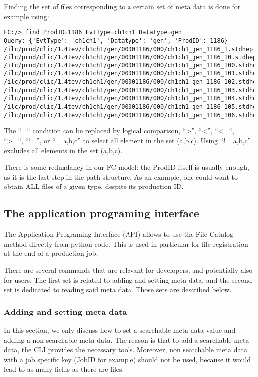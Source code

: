 \documentclass[11pt,a4paper]{scrartcl}
\begin{document}
Finding the set of files corresponding to a certain set of meta data is done
for example using:
\begin{lstlisting}
FC:/> find ProdID=1186 EvtType=ch1ch1 Datatype=gen
Query: {'EvtType': 'ch1ch1', 'Datatype': 'gen', 'ProdID': 1186}
/ilc/prod/clic/1.4tev/ch1ch1/gen/00001186/000/ch1ch1_gen_1186_1.stdhep
/ilc/prod/clic/1.4tev/ch1ch1/gen/00001186/000/ch1ch1_gen_1186_10.stdhep
/ilc/prod/clic/1.4tev/ch1ch1/gen/00001186/000/ch1ch1_gen_1186_100.stdhep
/ilc/prod/clic/1.4tev/ch1ch1/gen/00001186/000/ch1ch1_gen_1186_101.stdhep
/ilc/prod/clic/1.4tev/ch1ch1/gen/00001186/000/ch1ch1_gen_1186_102.stdhep
/ilc/prod/clic/1.4tev/ch1ch1/gen/00001186/000/ch1ch1_gen_1186_103.stdhep
/ilc/prod/clic/1.4tev/ch1ch1/gen/00001186/000/ch1ch1_gen_1186_104.stdhep
/ilc/prod/clic/1.4tev/ch1ch1/gen/00001186/000/ch1ch1_gen_1186_105.stdhep
/ilc/prod/clic/1.4tev/ch1ch1/gen/00001186/000/ch1ch1_gen_1186_106.stdhep
\end{lstlisting}

The ``=`` condition can be replaced by logical comparison, ``>'', ``<'', ``<=``,
``>=``, ``!='', or ``= a,b,c'' to select all element in the set (a,b,c). Using
``!= a,b,c'' excludes all elements in the set (a,b,c).

There is some redundancy in our FC model: the ProdID itself is usually enough,
as it is the last step in the path structure. As an example, one could want to
obtain ALL files of a given type, despite its production ID.

\subsection{The application programing interface}
The Application Programing Interface (API) allows to use the File Catalog method
directly from python code. This is used in particular for file registration
at the end of a production job.

There are several commands that are relevant for developers, and potentially
also for users. The first set is related to adding and setting meta data, and
the second set is dedicated to reading said meta data. Those sets are described
below.

\subsubsection{Adding and setting meta data}
In this section, we only discuss how to set a searchable meta data value and
adding a non searchable meta data. The reason is that to add a searchable meta
data, the CLI provides the necessary tools. Moreover, non searchable meta data
with a job specific key (JobID for example) should not be used, because it
would lead to as many fields as there are files.
\end{document}
